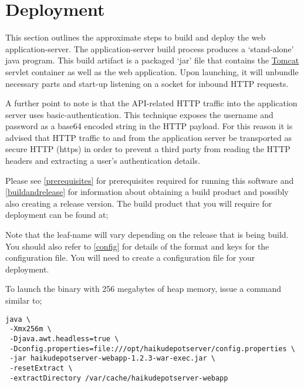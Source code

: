 
\section{Deployment}

This section outlines the approximate steps to build and deploy the web application-server.  The application-server build process produces a  `stand-alone' java program.  This build artifact is a packaged `jar' file that contains the \href{http://tomcat.apache.org}{Tomcat} servlet container as well as the web application.  Upon launching, it will unbundle necessary parts and start-up listening on a socket for inbound HTTP requests.


A further point to note is that the API-related HTTP traffic into the application server uses basic-authentication.  This technique exposes the username and password as a base64 encoded string in the HTTP payload.  For this reason it is advised that HTTP traffic to and from the application server be transported as secure HTTP (https) in order to prevent a third party from reading the HTTP headers and extracting a user's authentication details.

Please see \ref{prerequisites} for prerequisites required for running this software and \ref{buildandrelease} for information about obtaining a build product and possibly also creating a release version.  The build product that you will require for deployment can be found at;


Note that the leaf-name will vary depending on the release that is being build.  You should also refer to \ref{config} for details of the format and keys for the configuration file.  You will need to create a configuration file for your deployment.

To launch the binary with 256 megabytes of heap memory, issue a command similar to;

\begin{verbatim}
java \
 -Xmx256m \
 -Djava.awt.headless=true \
 -Dconfig.properties=file:///opt/haikudepotserver/config.properties \
 -jar haikudepotserver-webapp-1.2.3-war-exec.jar \
 -resetExtract \
 -extractDirectory /var/cache/haikudepotserver-webapp
\end{verbatim}


